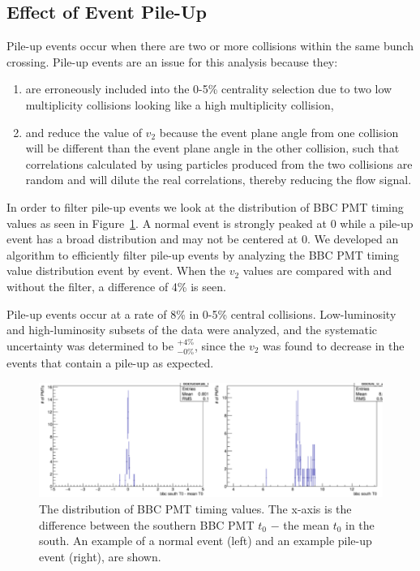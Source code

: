 \subsection{Effect of Event Pile-Up}
Pile-up events occur when there are two or more collisions within the same bunch crossing. Pile-up events are an issue for this analysis because they:
\begin{enumerate}
\item are erroneously included into the 0-5\% centrality selection due to two low multiplicity collisions looking like a high multiplicity collision,
\item and reduce the value of $v_2$ because the event plane angle from one collision will be different than the event plane angle in the other collision, such that correlations calculated by using particles produced from the two collisions are random and will dilute the real correlations, thereby reducing the flow signal.
\end{enumerate}

In order to filter pile-up events we look at the distribution of BBC PMT timing values as seen in Figure~\ref{fig:pile_up_example}. A normal event is strongly peaked at 0 while a pile-up event has a broad distribution and may not be centered at 0. We developed an algorithm to efficiently filter pile-up events by analyzing the BBC PMT timing value distribution event by event. When the $v_2$ values are compared with and without the filter, a difference of 4\% is seen. 

Pile-up events occur at a rate of 8\% in 0-5\% central \pau collisions. Low-luminosity and high-luminosity subsets of the data were analyzed, and the systematic uncertainty was determined to be $^{+4\%}_{-0\%}$, since the $v_2$  was found to decrease in the events that contain a pile-up as expected.

\begin{figure}[!h]
\begin{center}
\includegraphics[width=0.8\linewidth]{figs/example_pile_up_event.png}
\caption{The distribution of BBC PMT timing values. The x-axis is the difference between the southern BBC PMT $t_0$ $-$ the mean $t_0$ in the south. An example of a normal event (left) and an example pile-up event (right), are shown.}
\label{fig:pile_up_example}
\end{center}
\end{figure}


